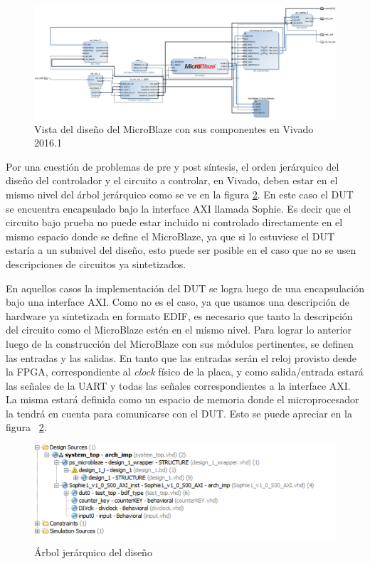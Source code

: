 \documentclass[a4paper,openright,12pt]{report}
\begin{document}
\begin{figure}[H]
	\centering
	\includegraphics[width=1.05\textwidth]{img/Micro.png}
	\caption{Vista del diseño del MicroBlaze con sus componentes en Vivado 2016.1}
	\label{Micro}
\end{figure}

Por una cuestión de problemas de pre y post síntesis, el orden jerárquico  del diseño  del controlador y el circuito a controlar, en Vivado, deben estar en el mismo nivel del árbol jerárquico  como se ve en la figura \ref{jera}. En este caso el DUT se encuentra encapsulado bajo la interface AXI llamada Sophie. Es decir que el circuito bajo prueba no puede estar incluido ni controlado directamente en el mismo espacio donde se define el MicroBlaze, ya que si lo estuviese el DUT estaría a un subnivel del diseño, esto puede ser posible en el caso que no se usen descripciones de circuitos ya sintetizados.  

En aquellos casos  la implementación del DUT se logra luego de una encapsulación bajo una interface AXI. Como no es el caso, ya que usamos una descripción de hardware  ya sintetizada en formato EDIF, es necesario que tanto la descripción del circuito como el MicroBlaze estén en el mismo nivel.
Para lograr lo anterior luego de la construcción del MicroBlaze con sus módulos pertinentes, se definen las entradas y las salidas. En tanto que las entradas serán el reloj provisto desde la FPGA, correspondiente al \textit{clock} físico de la placa, y como salida/entrada estará las señales de la UART y todas las señales correspondientes a la interface AXI. La misma estará definida como un espacio de  memoria donde el microprocesador la tendrá en cuenta para comunicarse con el DUT. Esto se puede apreciar en la  figura ~\ref{jera}.

\begin{figure}[H]
	\centering
	\includegraphics[width=1.1\textwidth]{img/jera.png}
	\caption{Árbol jerárquico del diseño }
	\label{jera}
\end{figure}
\end{document}
